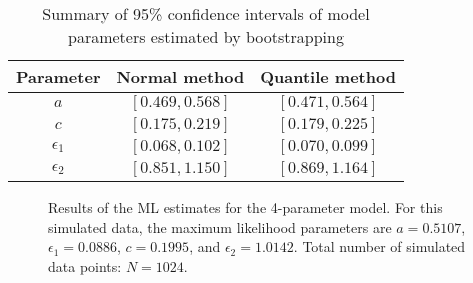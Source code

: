 \documentclass{article}
\begin{document}
\begin{table}
  \centering
  \begin{tabular}{ccc}
    \hline
    Parameter & Normal method & Quantile method \\
    \hline
    $a$ & $[0.469, 0.568]$ & $[0.471, 0.564]$ \\
    $c$ & $[0.175, 0.219]$ & $[0.179, 0.225]$ \\
    $\epsilon_1$ & $[0.068, 0.102]$ & $[0.070, 0.099]$ \\
    $\epsilon_2$ & $[0.851, 1.150]$ & $[0.869, 1.164]$\\
    \hline
  \end{tabular}
  \caption[Summary of confidence intervals]{Summary of 95\% confidence
    intervals of model parameters estimated by bootstrapping}
  \label{tab:conf-int}
\end{table}

\begin{figure}
  \centering
  \begin{subfigure}{0.48\textwidth}
  \end{subfigure}
  \hfill
  \begin{subfigure}{0.48\textwidth}
  \end{subfigure}
  \caption[4-parameter ML estimates]{Results of the ML estimates for
    the 4-parameter model. For this simulated data, the maximum
    likelihood parameters are $a = 0.5107$, $\epsilon_1 = 0.0886$,
    $c = 0.1995$, and $\epsilon_2 = 1.0142$. Total number of simulated
    data points: $N = 1024$.}
  \label{fig:4-par-fit}
\end{figure}
\end{document}
